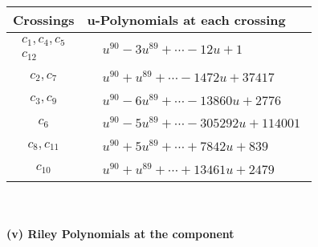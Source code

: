 \documentclass[1p]{elsarticle_modified}
\theoremstyle{definition}
\begin{document}
\begin{tabular}{m{50pt}|m{274pt}}
Crossings & \hspace{64pt}u-Polynomials at each crossing \\
\hline $$\begin{aligned}c_{1},c_{4},c_{5}\\c_{12}\end{aligned}$$&$\begin{aligned}
&u^{90}-3 u^{89}+\cdots-12 u+1
\end{aligned}$\\
\hline $$\begin{aligned}c_{2},c_{7}\end{aligned}$$&$\begin{aligned}
&u^{90}+u^{89}+\cdots-1472 u+37417
\end{aligned}$\\
\hline $$\begin{aligned}c_{3},c_{9}\end{aligned}$$&$\begin{aligned}
&u^{90}-6 u^{89}+\cdots-13860 u+2776
\end{aligned}$\\
\hline $$\begin{aligned}c_{6}\end{aligned}$$&$\begin{aligned}
&u^{90}-5 u^{89}+\cdots-305292 u+114001
\end{aligned}$\\
\hline $$\begin{aligned}c_{8},c_{11}\end{aligned}$$&$\begin{aligned}
&u^{90}+5 u^{89}+\cdots+7842 u+839
\end{aligned}$\\
\hline $$\begin{aligned}c_{10}\end{aligned}$$&$\begin{aligned}
&u^{90}+u^{89}+\cdots+13461 u+2479
\end{aligned}$\\
\hline
\end{tabular}\\~\\
\newpage\renewcommand{\arraystretch}{1}
\flushleft \textbf{(v) Riley Polynomials at the component}\newline \\
\end{document}
